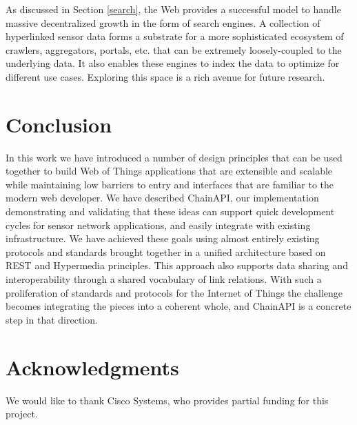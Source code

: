 \documentclass{acm_proc_article-sp}
\begin{document}
As discussed in Section \ref{search}, the Web provides a successful model to
handle massive decentralized growth in the form of search engines. A collection
of hyperlinked sensor data forms a substrate for a more sophisticated ecosystem
of crawlers, aggregators, portals, etc. that can be extremely loosely-coupled
to the underlying data. It also enables these engines to index the data to
optimize for different use cases. Exploring this space is a rich avenue for
future research.

\section{Conclusion}
In this work we have introduced a number of design principles that can be used
together to build Web of Things applications that are extensible and scalable
while maintaining low barriers to entry and interfaces that are familiar to the
modern web developer. We have described ChainAPI, our implementation
demonstrating and validating that these ideas can support quick development
cycles for sensor network applications, and easily integrate with existing
infrastructure. We have achieved these goals using almost entirely existing
protocols and standards brought together in a unified architecture based on
REST and Hypermedia principles. This approach also supports data sharing and
interoperability through a shared vocabulary of link relations. With such a
proliferation of standards and protocols for the Internet of Things the
challenge becomes integrating the pieces into a coherent whole, and ChainAPI
is a concrete step in that direction.

\section{Acknowledgments}
We would like to thank Cisco Systems, who provides partial funding for this
project.


%
%
\end{document}
